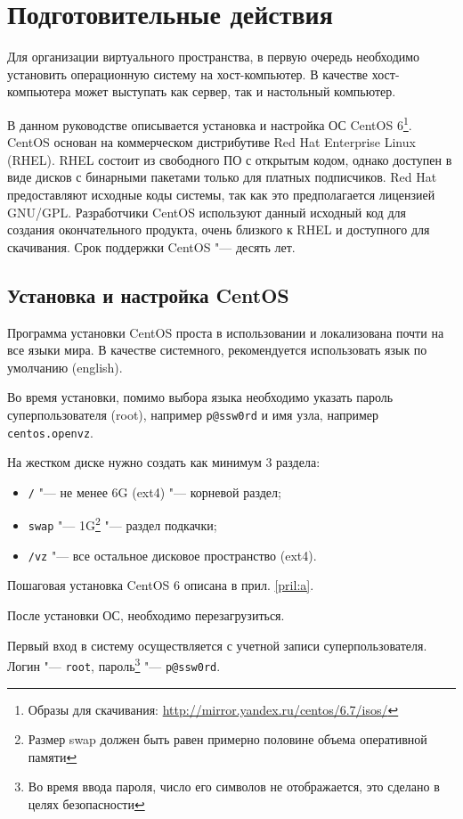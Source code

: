 \section{Подготовительные действия}

Для организации виртуального пространства, в первую очередь необходимо установить операционную систему на хост-компьютер. 
В качестве хост-компьютера может выступать как сервер, так и настольный компьютер.

В данном руководстве описывается установка и настройка ОС CentOS 6\footnote{Образы для скачивания: \url{http://mirror.yandex.ru/centos/6.7/isos/}}.
CentOS основан на коммерческом дистрибутиве Red Hat Enterprise Linux (RHEL). 
RHEL состоит из свободного ПО с открытым кодом, однако доступен в виде дисков с бинарными пакетами только для платных подписчиков. 
Red Hat предоставляют исходные коды системы, так как это предполагается лицензией GNU/GPL.
Разработчики CentOS используют данный исходный код для создания окончательного продукта, очень близкого к RHEL и доступного для скачивания.
Срок поддержки CentOS "--- десять лет.

\subsection{Установка и настройка CentOS}
Программа установки CentOS проста в использовании и локализована почти на все языки мира. 
В качестве системного, рекомендуется использовать язык по умолчанию (english).

Во время установки, помимо выбора языка необходимо указать пароль суперпользователя (root), например \texttt{p@ssw0rd} и имя узла, например \texttt{centos.openvz}.

На жестком диске нужно создать как минимум 3 раздела:
\begin{itemize}
\item \texttt{/} "--- не менее 6G (ext4) "--- корневой раздел;
\item \texttt{swap} "--- 1G\footnote{Размер swap должен быть равен примерно половине объема оперативной памяти} "--- раздел подкачки;
\item \texttt{/vz} "--- все остальное дисковое пространство (ext4).
\end{itemize}

Пошаговая установка CentOS 6 описана в прил. \ref{pril:a}.

После установки ОС, необходимо перезагрузиться.

Первый вход в систему осуществляется с учетной записи суперпользователя. Логин "--- \texttt{root}, пароль\footnote{Во время ввода пароля, число его символов не отображается, это сделано в целях безопасности} "--- \texttt{p@ssw0rd}.

